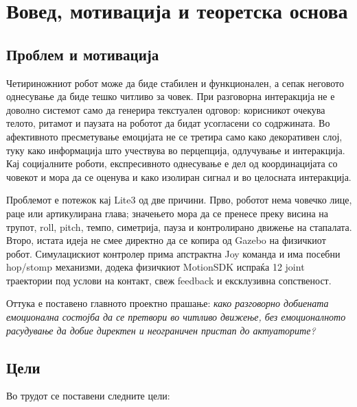 \chapter{Вовед, мотивација и теоретска основа}
\label{chap:intro}

\section{Проблем и мотивација}

Четириножниот робот може да биде стабилен и функционален, а сепак неговото
однесување да биде тешко читливо за човек. При разговорна интеракција не е
доволно системот само да генерира текстуален одговор: корисникот очекува
телото, ритамот и паузата на роботот да бидат усогласени со содржината. Во
афективното пресметување емоцијата не се третира само како декоративен слој,
туку како информација што учествува во перцепција, одлучување и интеракција.
Кај социјалните роботи, експресивното однесување е
дел од координацијата со човекот и мора да се оценува и како изолиран сигнал и
во целосната интеракција.

Проблемот е потежок кај Lite3 од две причини. Прво, роботот нема човечко лице,
раце или артикулирана глава; значењето мора да се пренесе преку висина на
трупот, roll, pitch, темпо, симетрија, пауза и контролирано движење на
стапалата. Второ, истата идеја не смее директно да се копира од Gazebo на
физичкиот робот. Симулацискиот контролер прима апстрактна Joy команда и има
посебни hop/stomp механизми, додека физичкиот MotionSDK испраќа 12 joint
траектории под услови на контакт, свеж feedback и ексклузивна сопственост.

Оттука е поставено главното проектно прашање: \emph{како разговорно
добиената емоционална состојба да се претвори во читливо движење, без
емоционалното расудување да добие директен и неограничен пристап до актуаторите?}

\section{Цели}

Во трудот се поставени следните цели:

